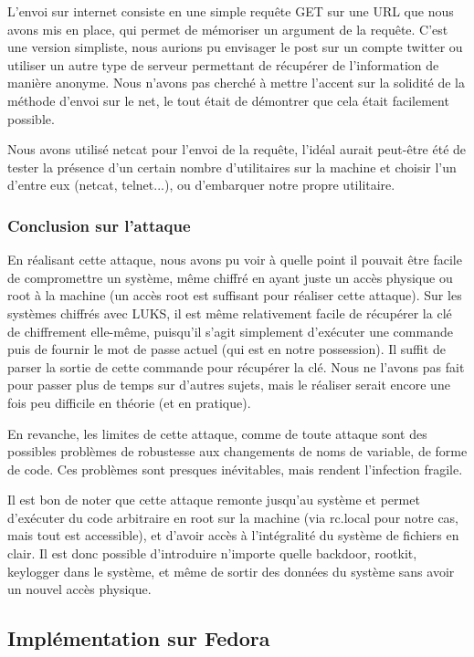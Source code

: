 \documentclass[12pt,a4paper]{article}
\begin{document}
L'envoi sur internet consiste en une simple requête GET sur une URL que nous
avons mis en place, qui permet de mémoriser un argument de la requête. C'est une
version simpliste, nous aurions pu envisager le post sur un compte twitter ou
utiliser un autre type de serveur permettant de récupérer de l'information de
manière anonyme. Nous n'avons pas cherché à mettre l'accent sur la solidité de
la méthode d'envoi sur le net, le tout était de démontrer que cela était
facilement possible.

Nous avons utilisé netcat pour l'envoi de la requête, l'idéal aurait peut-être
été de tester la présence d'un certain nombre d'utilitaires sur la machine et
choisir l'un d'entre eux (netcat, telnet...), ou d'embarquer notre propre
utilitaire.

\subsubsection*{Conclusion sur l'attaque}

En réalisant cette attaque, nous avons pu voir à quelle point il pouvait être
facile de compromettre un système, même chiffré en ayant juste un accès physique
ou root à la machine (un accès root est suffisant pour réaliser cette attaque).
Sur les systèmes chiffrés avec LUKS, il est même relativement facile de récupérer
la clé de chiffrement elle-même, puisqu'il s'agit simplement d'exécuter une
commande puis de fournir le mot de passe actuel (qui est en notre possession). Il 
suffit de parser la sortie de cette commande pour récupérer la clé. Nous ne 
l'avons pas fait pour passer plus de temps sur d'autres sujets, mais le réaliser
serait encore une fois peu difficile en théorie (et en pratique).

En revanche, les limites de cette attaque, comme de toute attaque sont des
possibles problèmes de robustesse aux changements de noms de variable, de forme
de code. Ces problèmes sont presques inévitables, mais rendent l'infection
fragile.

Il est bon de noter que cette attaque remonte jusqu'au système et permet
d'exécuter du code arbitraire en root sur la machine (via rc.local pour notre 
cas, mais tout est accessible), et d'avoir accès à l'intégralité du système de
fichiers en clair. Il est donc possible d'introduire n'importe quelle backdoor,
rootkit, keylogger dans le système, et même de sortir des données du système sans
avoir un nouvel accès physique.

\subsection{Implémentation sur Fedora}
\end{document}
